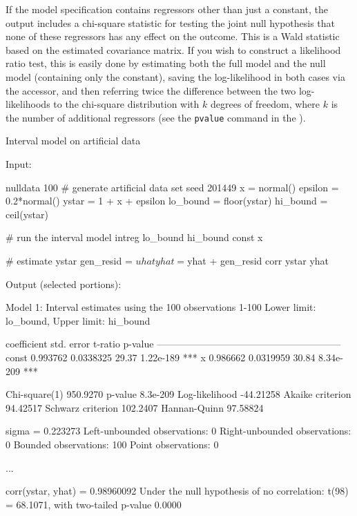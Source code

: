If the model specification contains regressors other than just a
constant, the output includes a chi-square statistic for testing the
joint null hypothesis that none of these regressors has any effect on
the outcome.  This is a Wald statistic based on the estimated
covariance matrix.  If you wish to construct a likelihood ratio test,
this is easily done by estimating both the full model and the null
model (containing only the constant), saving the log-likelihood in
both cases via the  accessor, and then referring twice the
difference between the two log-likelihoods to the chi-square
distribution with $k$ degrees of freedom, where $k$ is the number of
additional regressors (see the \texttt{pvalue} command in the \GCR).

\begin{script}[htbp]
  \caption{Interval model on artificial data}
  \label{ex:interval}
Input:
\begin{scodebit}
nulldata 100
# generate artificial data
set seed 201449 
x = normal()
epsilon = 0.2*normal()
ystar = 1 + x + epsilon
lo_bound = floor(ystar)
hi_bound = ceil(ystar)

# run the interval model
intreg lo_bound hi_bound const x

# estimate ystar
gen_resid = $uhat
yhat = $yhat + gen_resid
corr ystar yhat 
\end{scodebit}
Output (selected portions):
\begin{scodebit}
Model 1: Interval estimates using the 100 observations 1-100
Lower limit: lo_bound, Upper limit: hi_bound

             coefficient   std. error   t-ratio    p-value 
  ---------------------------------------------------------
  const       0.993762     0.0338325     29.37    1.22e-189 ***
  x           0.986662     0.0319959     30.84    8.34e-209 ***

Chi-square(1)        950.9270   p-value              8.3e-209
Log-likelihood      -44.21258   Akaike criterion     94.42517
Schwarz criterion    102.2407   Hannan-Quinn         97.58824

sigma = 0.223273
Left-unbounded observations: 0
Right-unbounded observations: 0
Bounded observations: 100
Point observations: 0

...

corr(ystar, yhat) = 0.98960092
Under the null hypothesis of no correlation:
 t(98) = 68.1071, with two-tailed p-value 0.0000
\end{scodebit}
\end{script}


